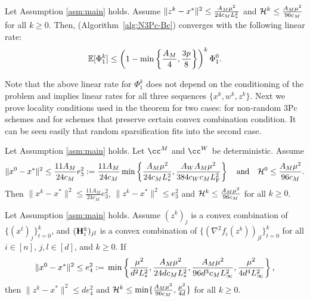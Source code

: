 \documentclass[11pt]{article}
\begin{document}
	\begin{theorem}\label{th:3PcBL1}
		Let Assumption \ref{asm:main} holds. Assume $\|z^k-x^*\|^2 \leq \frac{A_M \mu^2}{24c_M L_{*}^2}$ and ${\mathcal{H}}^k \leq \frac{A_M \mu^2}{96c_M}$ for all $k\geq 0$. Then,  (Algorithm~\ref{alg:N3Pc-Bc}) converges with the following linear rate:
		\begin{equation}\label{rate:local-linear-Bc}
			\squeeze
			\mathbb{E}[\Phi_1^k] \leq \left(  1 - \min\left\{  \frac{A_{M}}{4}, \frac{3p}{8}  \right\}  \right)^k \Phi_1^0.
		\end{equation}
	\end{theorem}
	
	Note that the above linear rate for $\Phi_1^k$ does not depend on the conditioning of the problem and implies linear rates for all three sequences $\{x^k,w^k,z^k\}$. Next we prove locality conditions used in the theorem for two cases: for non-random 3Pc schemes and for schemes that preserve certain convex combination condition. It can be seen easily that random sparsification fits into the second case.
	
	
	\begin{lemma}[Deterministic 3Pc]\label{lm:nbor-N3PcBc-det}
		Let Assumption \ref{asm:main} holds. Let $\cc^M$ and $\cc^W$ be deterministic. Assume $$\|x^0 - x^*\|^2 \leq \frac{11A_M}{24c_M} e_3^2 \; { := }\; \frac{11A_M}{24c_M}\min\left\{  \frac{A_M \mu^2}{24c_M L_{*}^2}, \frac{A_WA_M \mu^2}{384c_Wc_ML_{\rm F}^2}  \right\} \quad\text{and}\quad {\mathcal{H}}^0 \leq \frac{A_M \mu^2}{96c_M}.$$ Then $\|x^k-x^*\|^2 \leq \frac{11A_M}{24c_M} e_3^2$, $\|z^k - x^*\|^2 \leq e_3^2$ and ${\mathcal{H}}^k \leq  \frac{A_M \mu^2}{96c_M}$ for all $k\geq 0$.
	\end{lemma}
	\begin{lemma}\label{lm:nbor-N3PcBc-conv}
		Let Assumption \ref{asm:main} holds. Assume $(z^k)_j$ is a convex combination of $\{(x^t)_j\}_{t=0}^k$, and $(\mathbf{H}_i^k)_{jl}$ is a convex combination of $\{  (\nabla^2 f_i(z^k))_{jl}  \}_{t=0}^k$ for all $i\in [n]$, $j,l \in [d]$, and $k\geq 0$. If $$\|x^0-x^*\|^2 \leq e_4^2 \; { := }\; \min\left\{ \frac{\mu^2}{d^2 L_{*}^2}, \frac{A_M \mu^2}{24d c_M L_{*}^2}, \frac{A_M\mu^2}{96d^3 c_M L_{\infty}^2}, \frac{\mu^2}{4d^4 L_{\infty}^2} \right\},$$ then $\|z^k-x^*\|^2 \leq d e_4^2$ and ${\mathcal{H}}^k \leq \min \{  \frac{A_M\mu^2}{96c_M}, \frac{\mu^2}{4d}  \}$ for all $k\geq 0$. 
	\end{lemma}
	
	
\end{document}
